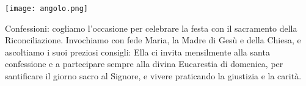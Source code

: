 \begin{center}
\vspace{1em}

\begin{minipage}{0.25\textwidth}
\texttt{[image: angolo.png]}
\end{minipage}
\hfill
\begin{minipage}{0.72\textwidth}
Confessioni: cogliamo l’occasione per celebrare la festa con il sacramento della Riconciliazione. Invochiamo con fede Maria, la Madre di Gesù e della Chiesa, e ascoltiamo i suoi preziosi consigli: Ella ci invita mensilmente alla santa confessione e a partecipare sempre alla divina Eucarestia di domenica, per santificare il giorno sacro al Signore, e vivere praticando la giustizia e la carità.
\end{minipage}

\end{center}


\normalsize
